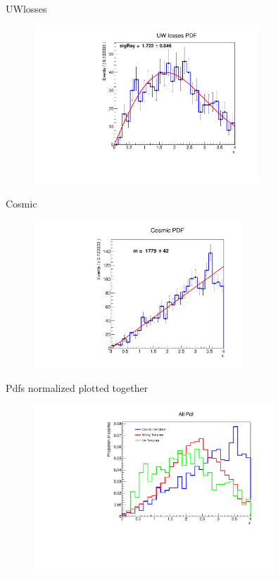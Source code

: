 \documentclass[9pt]{beamer}
\begin{document}
\begin{frame}{UWlosses}

\begin{figure}
\includegraphics[width = 0.75\textwidth]{FitToUW.pdf}
\end{figure}

\end{frame}

\begin{frame}{Cosmic}

\begin{figure}
\includegraphics[width = 0.7\textwidth]{Cosmici_fit.pdf}
\end{figure}

\end{frame}

\begin{frame}{Pdfs normalized plotted together}
\begin{figure}
\includegraphics[width = 0.80\textwidth]{PdfTogether.pdf}
\end{figure}
\end{frame}
\end{document}
